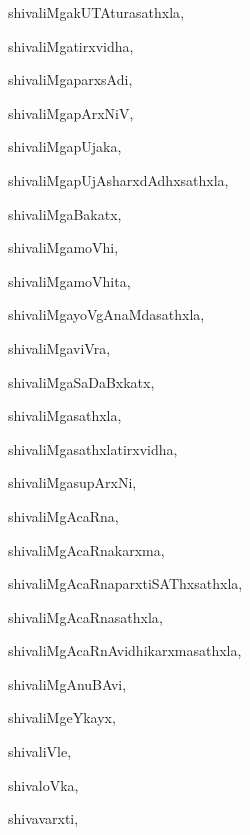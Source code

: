 \begin{multicols}{3}
{\noindent
{shivaliMgakUTAturasathxla}, \pageref{shivaliMgakUTAturasathxla}

\noindent
{shivaliMgatirxvidha}, \pageref{shivaliMgatirxvidha}

\noindent
{shivaliMgaparxsAdi}, \pageref{shivaliMgaparxsAdi}

\noindent
{shivaliMgapArxNiV}, \pageref{shivaliMgapArxNiV}

\noindent
{shivaliMgapUjaka}, \pageref{shivaliMgapUjaka}

\noindent
{shivaliMgapUjAsharxdAdhxsathxla}, \pageref{shivaliMgapUjAsharxdAdhxsathxla}

\noindent
{shivaliMgaBakatx}, \pageref{shivaliMgaBakatx}

\noindent
{shivaliMgamoVhi}, \pageref{shivaliMgamoVhi}

\noindent
{shivaliMgamoVhita}, \pageref{shivaliMgamoVhita}

\noindent
{shivaliMgayoVgAnaMdasathxla}, \pageref{shivaliMgayoVgAnaMdasathxla}

\noindent
{shivaliMgaviVra}, \pageref{shivaliMgaviVra}

\noindent
{shivaliMgaSaDaBxkatx}, \pageref{shivaliMgaSaDaBxkatx}

\noindent
{shivaliMgasathxla}, \pageref{shivaliMgasathxla}

\noindent
{shivaliMgasathxlatirxvidha}, \pageref{shivaliMgasathxlatirxvidha}

\noindent
{shivaliMgasupArxNi}, \pageref{shivaliMgasupArxNi}

\noindent
{shivaliMgAcaRna}, \pageref{shivaliMgAcaRna}

\noindent
{shivaliMgAcaRnakarxma}, \pageref{shivaliMgAcaRnakarxma}

\noindent
{shivaliMgAcaRnaparxtiSAThxsathxla}, \pageref{shivaliMgAcaRnaparxtiSAThxsathxla}

\noindent
{shivaliMgAcaRnasathxla}, \pageref{shivaliMgAcaRnasathxla}

\noindent
{shivaliMgAcaRnAvidhikarxmasathxla}, \pageref{shivaliMgAcaRnAvidhikarxmasathxla}

\noindent
{shivaliMgAnuBAvi}, \pageref{shivaliMgAnuBAvi}

\noindent
{shivaliMgeYkayx}, \pageref{shivaliMgeYkayx}

\noindent
{shivaliVle}, \pageref{shivaliVle}

\noindent
{shivaloVka}, \pageref{shivaloVka}

\noindent
{shivavarxti}, \pageref{shivavarxti}

}
\end{multicols}
